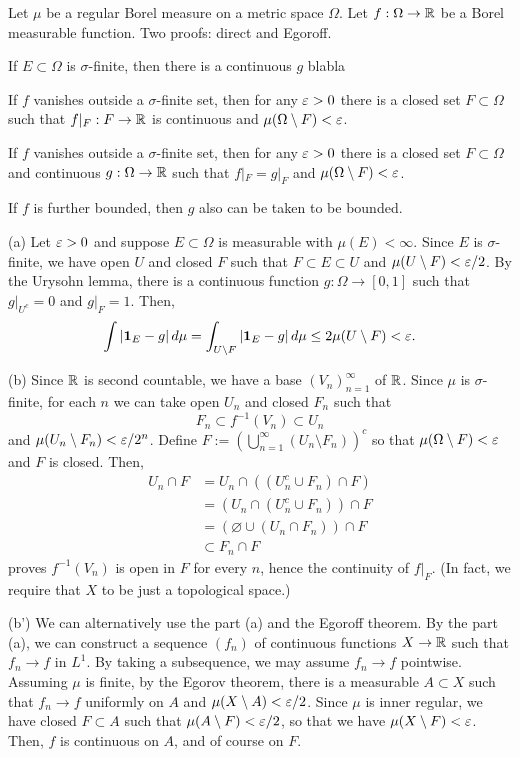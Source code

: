 \documentclass{../../large}
\begin{document}
\begin{prb}
Let $\mu$ be a regular Borel measure on a metric space $\Omega$.
Let $f:\Omega\to\mathbb{R}$ be a Borel measurable function.
Two proofs: direct and Egoroff.
\begin{parts}
\item If $E\subset\Omega$ is $\sigma$-finite, then there is a continuous $g$ blabla
\item If $f$ vanishes outside a $\sigma$-finite set, then for any $\varepsilon>0$ there is a closed set $F\subset \Omega$ such that $f|_F:F\to\mathbb{R}$ is continuous and $\mu(\Omega\setminus F)<\varepsilon$.
\item If $f$ vanishes outside a $\sigma$-finite set, then for any $\varepsilon>0$ there is a closed set $F\subset \Omega$ and continuous $g:\Omega\to\mathbb{R}$ such that $f|_F=g|_F$ and $\mu(\Omega\setminus F)<\varepsilon$.
\item If $f$ is further bounded, then $g$ also can be taken to be bounded.
\end{parts}
\end{prb}
\begin{pf}
(a)
Let $\varepsilon>0$ and suppose $E\subset \Omega$ is measurable with $\mu(E)<\infty$.
Since $E$ is $\sigma$-finite, we have open $U$ and closed $F$ such that $F\subset E\subset U$ and $\mu(U\setminus F)<\varepsilon/2$.
By the Urysohn lemma, there is a continuous function $g:\Omega\to[0,1]$ such that $g|_{U^c}=0$ and $g|_F=1$.
Then,
\[\int|\mathbf{1}_E-g|\,d\mu=\int_{U\setminus F}|\mathbf{1}_E-g|\,d\mu\le2\mu(U\setminus F)<\varepsilon.\]

(b)
Since $\mathbb{R}$ is second countable, we have a base $(V_n)_{n=1}^\infty$ of $\mathbb{R}$.
Since $\mu$ is $\sigma$-finite, for each $n$ we can take open $U_n$ and closed $F_n$ such that
\[F_n\subset f^{-1}(V_n)\subset U_n\]
and $\mu(U_n\setminus F_n)<\varepsilon/2^n$.
Define $F:=\left(\bigcup_{n=1}^\infty(U_n\setminus F_n)\right)^c$ so that $\mu(\Omega\setminus F)<\varepsilon$ and $F$ is closed.
Then,
\begin{align*}
U_n\cap F
&=U_n\cap((U_n^c\cup F_n)\cap F)\\
&=(U_n\cap(U_n^c\cup F_n))\cap F\\
&=(\varnothing\cup(U_n\cap F_n))\cap F\\
&\subset F_n\cap F
\end{align*}
proves $f^{-1}(V_n)$ is open in $F$ for every $n$, hence the continuity of $f|_F$.
(In fact, we require that $X$ to be just a topological space.)

(b')
We can alternatively use the part (a) and the Egoroff theorem.
By the part (a), we can construct a sequence $(f_n)$ of continuous functions $X\to\mathbb{R}$ such that $f_n\to f$ in $L^1$.
By taking a subsequence, we may assume $f_n\to f$ pointwise.
Assuming $\mu$ is finite, by the Egorov theorem, there is a measurable $A\subset X$ such that $f_n\to f$ uniformly on $A$ and $\mu(X\setminus A)<\varepsilon/2$.
Since $\mu$ is inner regular, we have closed $F\subset A$ such that $\mu(A\setminus F)<\varepsilon/2$, so that we have $\mu(X\setminus F)<\varepsilon$.
Then, $f$ is continuous on $A$, and of course on $F$.

\end{pf}
\end{document}
